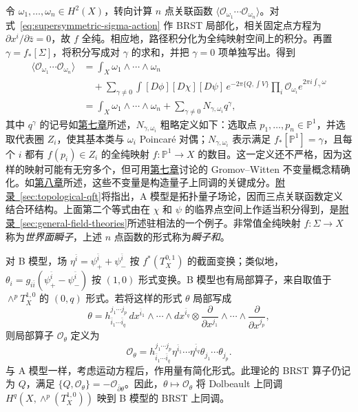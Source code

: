 令 $\omega_1,\ldots,\omega_n\in H^2(X)$，转向计算 $n$ 点关联函数 $\langle\mathcal O_{\omega_1}\cdots\mathcal O_{\omega_n}\rangle$。对式~\eqref{eq:supersymmetric-sigma-action} 作 BRST 局部化，相关固定点方程为 $\partial x^i/\partial\bar z=0$，故 $f$ 全纯。相应地，路径积分化为全纯映射空间上的积分。再置 $\gamma=f_*[\Sigma]$，将积分写成对 $\gamma$ 的求和，并把 $\gamma=0$ 项单独写出。得到
\[
\begin{aligned}
\langle\mathcal O_{\omega_1}\cdots\mathcal O_{\omega_n}\rangle
&=\int_X\omega_1\wedge\cdots\wedge\omega_n\\
&\quad+\sum_{\gamma\ne0}\int[D\phi][D\chi][D\psi]\,
e^{-2\pi\{Q,\int V\}}\prod_i\mathcal O_{\omega_i}
e^{2\pi i\int_\gamma\omega}\\
&=\int_X\omega_1\wedge\cdots\wedge\omega_n
+\sum_{\gamma\ne0}N_{\gamma,\omega_i}q^\gamma,
\end{aligned}
\]
其中 $q^\gamma$ 的记号如\hyperref[chap:gromov-witten]{第七章}所述，$N_{\gamma,\omega_i}$ 粗略定义如下：选取点 $p_1,\ldots,p_n\in\mathbb P^1$，并选取代表圈 $Z_i$，使其基本类与 $\omega_i$ Poincaré 对偶；$N_{\gamma,\omega_i}$ 表示满足 $f_*[\mathbb P^1]=\gamma$，且每个 $i$ 都有 $f(p_i)\in Z_i$ 的全纯映射 $f:\mathbb P^1\to X$ 的数目。这一定义还不严格，因为这样的映射可能有无穷多个，但可用\hyperref[chap:gromov-witten]{第七章}讨论的 Gromov--Witten 不变量概念精确化。如\hyperref[chap:quantum-cohomology]{第八章}所述，这些不变量是构造量子上同调的关键成分。\hyperref[sec:topological-qft]{附录~\ref*{sec:topological-qft}}将指出，A 模型是拓扑量子场论，因而三点关联函数定义结合环结构。上面第二个等式由在 $\chi$ 和 $\psi$ 的临界点空间上作适当积分得到，是\hyperref[sec:general-field-theories]{附录~\ref*{sec:general-field-theories}}所述驻相法的一个例子。非常值全纯映射 $f:\Sigma\to X$ 称为\emph{世界面瞬子}，上述 $n$ 点函数的形式称为\emph{瞬子和}。

对 B 模型，场 $\eta^{\bar i}=\psi_+^{\bar i}+\psi_-^{\bar i}$ 按 $f^*(T_X^{0,1})$ 的截面变换；类似地，$\theta_i=g_{i\bar i}(\psi_+^{\bar i}-\psi_-^{\bar i})$ 按 $(1,0)$ 形式变换。B 模型也有局部算子，来自取值于 $\wedge^pT_X^{1,0}$ 的 $(0,q)$ 形式。若将这样的形式 $\theta$ 局部写成
\[
\theta=h^{j_1\cdots j_p}_{\bar i_1\cdots\bar i_q}\,
dx^{\bar i_1}\wedge\cdots\wedge dx^{\bar i_q}
\otimes\frac{\partial}{\partial x^{j_1}}\wedge\cdots\wedge
\frac{\partial}{\partial x^{j_p}},
\]
则局部算子 $\mathcal O_\theta$ 定义为
\[
\mathcal O_\theta=h^{j_1\cdots j_p}_{\bar i_1\cdots\bar i_q}
\eta^{\bar i_1}\cdots\eta^{\bar i_q}\theta_{j_1}\cdots\theta_{j_p}.
\]
与 A 模型一样，考虑运动方程后，作用量有简化形式。此理论的 BRST 算子仍记为 $Q$，满足 $\{Q,\mathcal O_\theta\}=-\mathcal O_{\bar\partial\theta}$。因此，$\theta\mapsto\mathcal O_\theta$ 将 Dolbeault 上同调 $H^q(X,\wedge^p(T_X^{1,0}))$ 映到 B 模型的 BRST 上同调。

